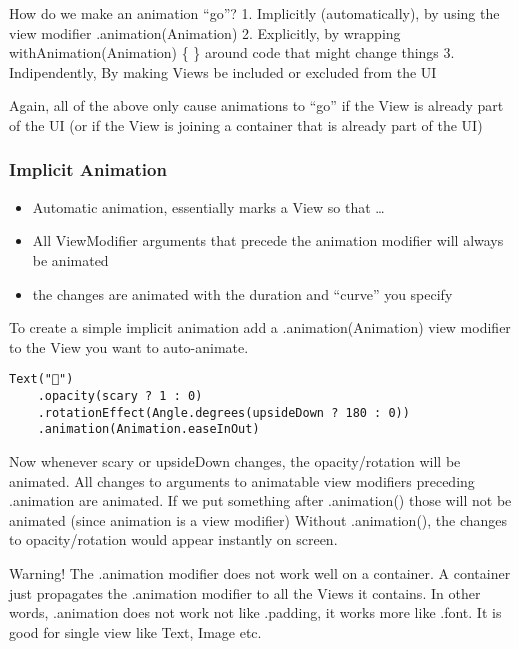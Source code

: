 \documentclass[]{article}
\providecommand{\tightlist}{%
  \setlength{\itemsep}{0pt}\setlength{\parskip}{0pt}}
\begin{document}
How do we make an animation ``go''? 1. Implicitly (automatically), by
using the view modifier .animation(Animation) 2. Explicitly, by wrapping
withAnimation(Animation) \{ \} around code that might change things 3.
Indipendently, By making Views be included or excluded from the UI

Again, all of the above only cause animations to ``go'' if the View is
already part of the UI (or if the View is joining a container that is
already part of the UI)

\hypertarget{implicit-animation}{%
\subsubsection{Implicit Animation}\label{implicit-animation}}

\begin{itemize}
\tightlist
\item
  Automatic animation, essentially marks a View so that \ldots{}
\item
  All ViewModifier arguments that precede the animation modifier will
  always be animated
\item
  the changes are animated with the duration and ``curve'' you specify
\end{itemize}

To create a simple implicit animation add a .animation(Animation) view
modifier to the View you want to auto-animate.

\begin{verbatim}
Text("👻")
    .opacity(scary ? 1 : 0)
    .rotationEffect(Angle.degrees(upsideDown ? 180 : 0))
    .animation(Animation.easeInOut)
\end{verbatim}

Now whenever scary or upsideDown changes, the opacity/rotation will be
animated. All changes to arguments to animatable view modifiers
preceding .animation are animated. If we put something after
.animation() those will not be animated (since animation is a view
modifier) Without .animation(), the changes to opacity/rotation would
appear instantly on screen.

Warning! The .animation modifier does not work well on a container. A
container just propagates the .animation modifier to all the Views it
contains. In other words, .animation does not work not like .padding, it
works more like .font. It is good for single view like Text, Image etc.
\end{document}
